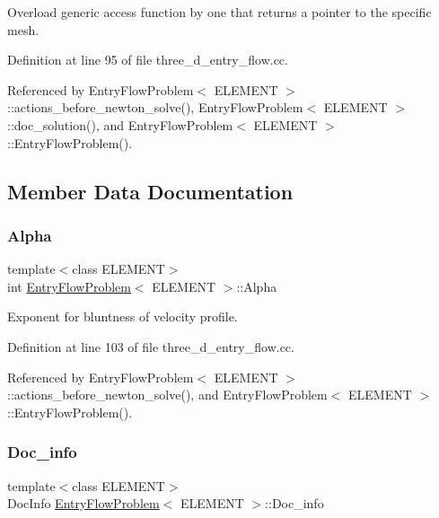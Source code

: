 Overload generic access function by one that returns a pointer to the specific mesh. 



Definition at line 95 of file three\+\_\+d\+\_\+entry\+\_\+flow.\+cc.



Referenced by Entry\+Flow\+Problem$<$ E\+L\+E\+M\+E\+N\+T $>$\+::actions\+\_\+before\+\_\+newton\+\_\+solve(), Entry\+Flow\+Problem$<$ E\+L\+E\+M\+E\+N\+T $>$\+::doc\+\_\+solution(), and Entry\+Flow\+Problem$<$ E\+L\+E\+M\+E\+N\+T $>$\+::\+Entry\+Flow\+Problem().



\subsection{Member Data Documentation}
\mbox{\label{classEntryFlowProblem_a4b69957951a6367b12bf02c1a8d9ad2a}} 
\subsubsection{\texorpdfstring{Alpha}{Alpha}}
{\footnotesize\ttfamily template$<$class E\+L\+E\+M\+E\+NT$>$ \\
int \hyperlink{classEntryFlowProblem}{Entry\+Flow\+Problem}$<$ E\+L\+E\+M\+E\+NT $>$\+::Alpha\hspace{0.3cm}{\ttfamily [private]}}



Exponent for bluntness of velocity profile. 



Definition at line 103 of file three\+\_\+d\+\_\+entry\+\_\+flow.\+cc.



Referenced by Entry\+Flow\+Problem$<$ E\+L\+E\+M\+E\+N\+T $>$\+::actions\+\_\+before\+\_\+newton\+\_\+solve(), and Entry\+Flow\+Problem$<$ E\+L\+E\+M\+E\+N\+T $>$\+::\+Entry\+Flow\+Problem().

\mbox{\label{classEntryFlowProblem_abf50dd060db0e4c31628cfd228e096b8}} 
\subsubsection{\texorpdfstring{Doc\+\_\+info}{Doc\_info}}
{\footnotesize\ttfamily template$<$class E\+L\+E\+M\+E\+NT$>$ \\
Doc\+Info \hyperlink{classEntryFlowProblem}{Entry\+Flow\+Problem}$<$ E\+L\+E\+M\+E\+NT $>$\+::Doc\+\_\+info\hspace{0.3cm}{\ttfamily [private]}}



